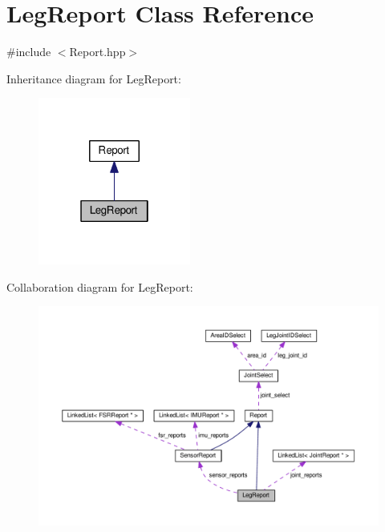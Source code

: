 \hypertarget{classLegReport}{}\section{Leg\+Report Class Reference}
\label{classLegReport}


{\ttfamily \#include $<$Report.\+hpp$>$}



Inheritance diagram for Leg\+Report\+:\nopagebreak
\begin{figure}[H]
\begin{center}
\leavevmode
\includegraphics[width=142pt]{classLegReport__inherit__graph}
\end{center}
\end{figure}


Collaboration diagram for Leg\+Report\+:
\nopagebreak
\begin{figure}[H]
\begin{center}
\leavevmode
\includegraphics[width=350pt]{classLegReport__coll__graph}
\end{center}
\end{figure}
